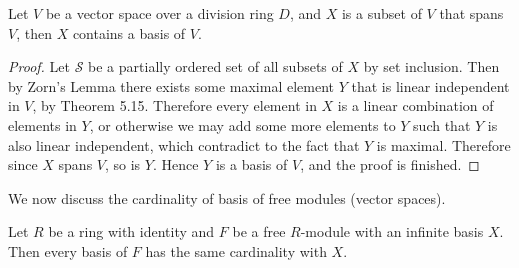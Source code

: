 \begin{theorem}
Let $V$ be a vector space over a division ring $D$, and $X$ is a subset of $V$ that spans $V$, then $X$ contains a basis of $V$.
\end{theorem}
\begin{proof}
Let $\mathcal{S}$ be a partially ordered set of all subsets of $X$ by set inclusion. Then by Zorn's Lemma there exists some maximal element $Y$ that is linear independent in $V$, by Theorem 5.15. Therefore every element in $X$ is a linear combination of elements in $Y$, or otherwise we may add some more elements to $Y$ such that $Y$ is also linear independent, which contradict to the fact that $Y$ is maximal. Therefore since $X$ spans $V$, so is $Y$. Hence $Y$ is a basis of $V$, and the proof is finished.
\end{proof}
We now discuss the cardinality of basis of free modules (vector spaces).
\begin{theorem}
Let $R$ be a ring with identity and $F$ be a free $R$-module with an infinite basis $X$. Then every basis of $F$ has the same cardinality with $X$.
\end{theorem}
